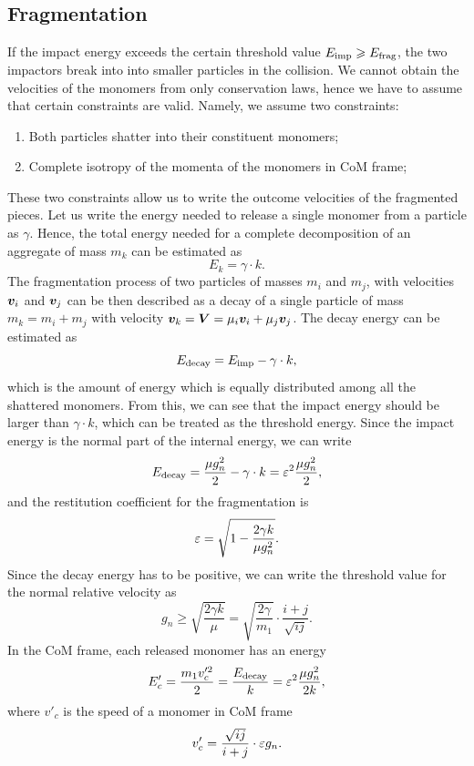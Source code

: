 \documentclass[aps,prl,preprint,groupedaddress,10pt]{revtex4-2}
\begin{document}
\subsection{Fragmentation}
If the impact energy exceeds the certain threshold value
$E_{\mathrm{imp}}\geqslant E_{\mathrm{frag}}$, the two impactors break into into smaller
particles in the collision.
We cannot obtain the velocities of the monomers from only conservation laws, hence
we have to assume that certain constraints are valid. Namely, we assume two
constraints:
\begin{enumerate}
    \item Both particles shatter into their constituent monomers;
    \item Complete isotropy of the momenta of the monomers in CoM frame;
\end{enumerate}
These two constraints allow us to write the outcome velocities of the fragmented pieces.
Let us write the energy needed to release a single monomer from a particle as $\gamma$.
Hence, the total energy needed for a complete decomposition of an aggregate of mass $m_k$
can be estimated as
\begin{equation}
    E_k = \gamma\cdot k.
\end{equation}
The fragmentation process of two particles of masses $m_i$ and $m_j$, with velocities
$\vb*{v}_i$ and $\vb*{v}_j$ can be then described as a decay of a single particle of mass
$m_k=m_i+m_j$ with velocity $\vb*{v}_k=\vb*{V}=\mu_i\vb*{v}_i+\mu_j\vb*{v}_j$. The decay energy can
be estimated as
\begin{equation}
    E_{\mathrm{decay}}=E_{\mathrm{imp}}-\gamma\cdot k,
\end{equation}
which is the amount of energy which is equally distributed among all the shattered
monomers. From this, we can see that the impact energy should be larger than
$\gamma\cdot k$, which can be treated as the threshold energy. Since the impact energy
is the normal part of the internal energy, we can write
\begin{equation}
    E_{\mathrm{decay}}=\frac{\mu g_n^2}{2}-\gamma\cdot k=\varepsilon^2\frac{\mu g_n^2}{2},
\end{equation}
and the restitution coefficient for the fragmentation is
\begin{equation}
    \varepsilon=\sqrt{1-\frac{2\gamma k}{\mu g_n^2}}.
\end{equation}
Since the decay energy has to be positive, we can write the threshold value for the
normal relative velocity as
\begin{equation}
    g_n\geqslant\sqrt{\frac{2\gamma k}{\mu}}=
    \sqrt{\frac{2\gamma}{m_1}}\cdot\frac{i+j}{\sqrt{ij}}.
\end{equation}
In the CoM frame, each released monomer has an energy
\begin{equation}
    E'_{c}=\frac{m_1v'^2_{c}}{2}=\frac{E_{\mathrm{decay}}}{k}=\varepsilon^2\frac{\mu g_n^2}{2k},
\end{equation}
where $v'_{c}$ is the speed of a monomer in CoM frame
\begin{equation}
    v'_{c}=\frac{\sqrt{ij}}{i+j}\cdot\varepsilon g_n.
\end{equation}
\end{document}
